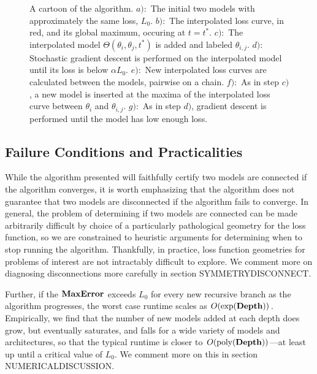  \begin{figure}
\begin{center}
\end{center}
\caption{A cartoon of the algorithm.  $a):$ The initial two models with approximately the same loss, $L_0$. $b):$ The interpolated loss curve, in red, and its global maximum, occuring at $t=t^*$. $c):$ The interpolated model $\Theta(\theta_i, \theta_j, t^*)$ is added and labeled $\theta_{i,j}$.  $d):$ Stochastic gradient descent is performed on the interpolated model until its loss is below $\alpha L_0$. $e):$ New interpolated loss curves are calculated between the models, pairwise on a chain.  $f):$ As in step $c)$, a new model is inserted at the maxima of the interpolated loss curve between $\theta_i$ and $\theta_{i,j}$.  $g):$  As in step $d)$, gradient descent is performed until the model has low enough loss.}
\label{fig:AlgorithmFigure}
\end{figure}
 
  
  \subsection{Failure Conditions and Practicalities}
  \label{sec:Fail}
  
  While the algorithm presented will faithfully certify two models are connected if the algorithm converges, it is worth emphasizing that the algorithm does not guarantee that two models are disconnected if the algorithm fails to converge.  In general, the problem of determining if two models are connected can be made arbitrarily difficult by choice of a particularly pathological geometry for the loss function, so we are constrained to heuristic arguments for determining when to stop running the algorithm.  Thankfully, in practice, loss function geometries for problems of interest are not intractably difficult to explore.  We comment more on diagnosing disconnections more carefully in section SYMMETRYDISCONNECT.
  
  Further, if the $\rm{\mathbf{MaxError}}$ exceeds $L_0$ for every new recursive branch as the algorithm progresses, the worst case runtime scales as $O(\rm{exp}(\rm{\mathbf{Depth}}))$.  Empirically, we find that the number of new models added at each depth does grow, but eventually saturates, and falls for a wide variety of models and architectures, so that the typical runtime is closer to $O(\rm{poly}(\rm{\mathbf{Depth}}))$---at least up until a critical value of $L_0$.  We comment more on this in section NUMERICALDISCUSSION.
  
